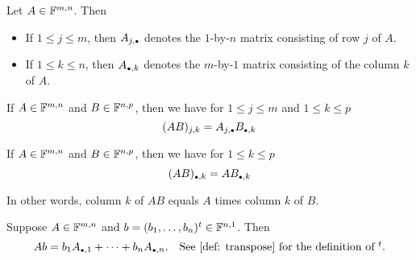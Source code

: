 \begin{mydef}  Let $A\in \mathbb{F}^{m,n}$. Then
  \begin{itemize}
    \item If $1 \leq j \leq m$, then $A_{j, \mathsmaller{\bullet}}$ denotes the $1$-by-$n$ matrix consisting of row $j$ of $A$. 
    \item If $1 \leq k \leq n$, then  $A_{\mathsmaller{\bullet}, k}$ denotes the $m$-by-$1$ matrix consisting of the column $k$ of $A$.
  \end{itemize}
\end{mydef}

\setcounter{thm}{45}
\begin{thm} 
  If $A \in \mathbb{F}^{m,n}$ and $B \in \mathbb{F}^{n,p}$, then we have for $1 \leq j \leq m$ and $1 \leq k \leq p$
  \begin{equation}
    (AB)_{j,k} = A_{j, \mathsmaller{\bullet}} B_{\mathsmaller{\bullet}, k}
  \end{equation}
\end{thm}

\setcounter{thm}{47}
\begin{thm}
  If $A \in \mathbb{F}^{m,n}$ and $B \in \mathbb{F}^{n,p}$, then we have for $1 \leq k \leq p$
  \begin{equation}
    (AB)_{\mathsmaller{\bullet}, k} = AB_{\mathsmaller{\bullet}, k}
  \end{equation}
  
  In other words, column $k$ of $AB$ equals $A$ times column $k$ of $B$.
\end{thm}

\setcounter{thm}{49}
\begin{thm}
  Suppose $A \in \mathbb{F}^{m,n}$ and  $b = (b_1, \ldots, b_n)^{t}\in \mathbb{F}^{n,1}$. Then 
  \begin{equation}
    Ab = b_1 A_{\mathsmaller{\bullet}, 1} + \dots + b_n A_{\mathsmaller{\bullet},n}. \quad $See \ref{def: transpose} for the definition of $^t.
  \end{equation}
\end{thm}

